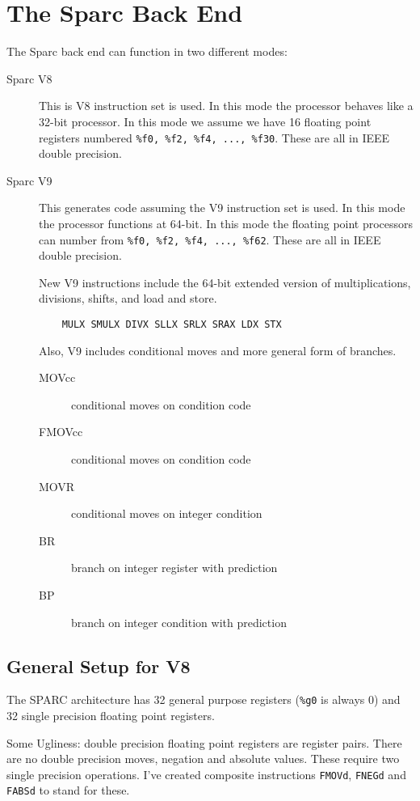 \section{The Sparc Back End}

The Sparc back end can function in two different modes:
\begin{description}
  \item[Sparc V8]  This is V8 instruction set is used.  In this mode the processor
behaves like a 32-bit processor.   In this mode we assume we
have 16 floating point registers numbered \verb|%f0, %f2, %f4, ..., %f30|.
These are all in IEEE double precision.
  \item[Sparc V9]  This generates code assuming the V9 instruction set is used.
In this mode the processor functions at 64-bit.  In this mode the 
floating point processors can number from \verb|%f0, %f2, %f4, ..., %f62|.
These are all in IEEE double precision.

  New V9 instructions include the 64-bit extended version of multiplications,
divisions, shifts, and load and store.
\begin{verbatim}
    MULX SMULX DIVX SLLX SRLX SRAX LDX STX
\end{verbatim}

  Also, V9 includes conditional moves and more general form of branches.
\begin{description}
  \item[MOVcc]  conditional moves on condition code 
  \item[FMOVcc] conditional moves on condition code 
  \item[MOVR]   conditional moves on integer condition 
  \item[BR]     branch on integer register with prediction 
  \item[BP]     branch on integer condition with prediction 
\end{description}
\end{description}

\subsection{General Setup for V8}

 The SPARC architecture has 32 general purpose registers 
 (\verb|%g0| is always 0)
 and 32 single precision floating point registers.

 Some Ugliness: double precision floating point registers are
 register pairs.  There are no double precision moves, negation and absolute
 values.  These require two single precision operations.  I've created
 composite instructions \verb|FMOVd|, 
  \verb|FNEGd| and 
  \verb|FABSd| to stand for these.
 
